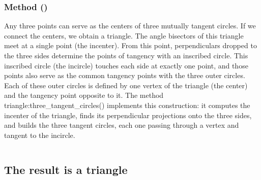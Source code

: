 
\subsubsection{Method ()}
\label{ssub:method_triangle_three_tgt_c}

Any three points can serve as the centers of three mutually tangent circles. If we connect the centers, we obtain a triangle. The angle bisectors of this triangle meet at a single point (the incenter). From this point, perpendiculars dropped to the three sides determine the points of tangency with an inscribed circle.
This inscribed circle (the incircle) touches each side at exactly one point, and those points also serve as the common tangency points with the three outer circles. Each of these outer circles is defined by one vertex of the triangle (the center) and the tangency point opposite to it.
The method triangle:three_tangent_circles() implements this construction:
it computes the incenter of the triangle,
finds its perpendicular projections onto the three sides,
and builds the three tangent circles, each one passing through a vertex and tangent to the incircle.

\begin{tkzexample}[latex=.5\textwidth]
\end{tkzexample}


$  $





\subsection{The result is a triangle} %

